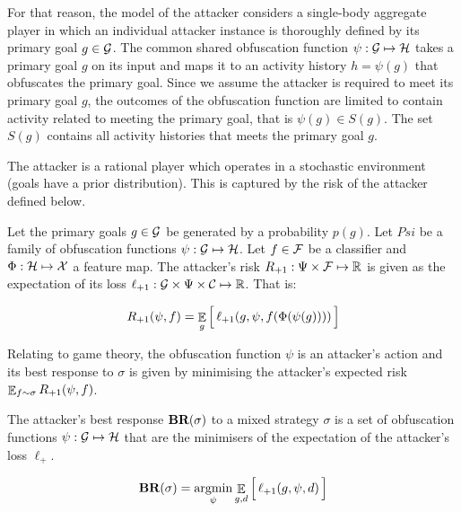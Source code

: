 For that reason, the model of the attacker considers a single-body aggregate player in which an individual attacker instance is thoroughly defined by its primary goal $g \in \mathcal{G}$. The common shared obfuscation function $\psi: \mathcal{G} \mapsto \mathcal{H}$ takes a primary goal $g$ on its input and maps it to an activity history $h = \psi(g)$ that obfuscates the primary goal. Since we assume the attacker is required to meet its primary goal $g$, the outcomes of the obfuscation function are limited to contain activity related to meeting the primary goal, that is $\psi(g) \in S(g)$. The set $S(g)$ contains all activity histories that meets the primary goal $g$.

The attacker is a rational player which operates in a stochastic environment (goals have a prior distribution). This is captured by the risk of the attacker defined below.

\begin{definition}
    Let the primary goals $g \in \mathcal{G}$ be generated by a probability $p(g)$. Let $Psi$ be a family of obfuscation functions $\psi: \mathcal{G} \mapsto \mathcal{H}$. Let $f \in \mathcal{F}$ be a classifier and $\Phi: \mathcal{H} \mapsto \mathcal{X}$ a feature map. The attacker's risk $R_{{\text{+}1}} : \Psi \times \mathcal{F} \mapsto \mathbb{R}$ is given as the expectation of its loss $\ell_{{\text{+}1}} : \mathcal{G} \times \Psi \times \mathcal{C} \mapsto \mathbb{R}$. That is:

    \begin{equation*}
        R_{{\text{+}1}}(\psi, f) = \mathop{\mathbb{E}}_g \Big[\, \ell_{{\text{+}1}} (g, \psi, f(\Phi(\psi(g)))) \,\Big]
    \end{equation*}

\end{definition}

Relating to game theory, the obfuscation function $\psi$ is an attacker's action and its best response to $\sigma$ is given by minimising the attacker's expected risk $\mathop{\mathbb{E}}_{f \sim \sigma} R_{{\text{+}1}}(\psi, f)$.

\begin{proposition}\label{prop:br}
    The attacker's best response $\textbf{BR}(\sigma)$ to a mixed strategy $\sigma$ is a set of obfuscation functions $\psi: \mathcal{G} \mapsto \mathcal{H}$ that are the minimisers of the expectation of the attacker's loss $\ell_\plus$.

    \begin{equation*}
        \textbf{BR}(\sigma) = \mathop{\text{argmin}}_\psi \mathop{\mathbb{E}}_{g,d} \Big[\, \ell_{{\text{+}1}} (g, \psi, d) \,\Big]
    \end{equation*}
\end{proposition}

